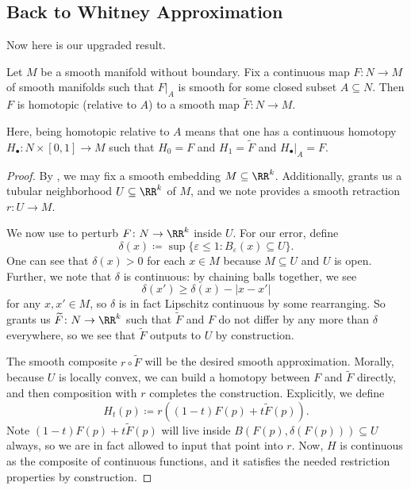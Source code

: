 \documentclass[../notes.tex]{subfiles}
\begin{document}
\subsection{Back to Whitney Approximation}
Now here is our upgraded result.
\begin{theorem}
	Let $M$ be a smooth manifold without boundary. Fix a continuous map $F\colon N\to M$ of smooth manifolds such that $F|_A$ is smooth for some closed subset $A\subseteq N$. Then $F$ is homotopic (relative to $A$) to a smooth map $\widetilde F\colon N\to M$.
\end{theorem}
Here, being homotopic relative to $A$ means that one has a continuous homotopy $H_\bullet\colon N\times[0,1]\to M$ such that $H_0=F$ and $H_1=\widetilde F$ and $H_\bullet|_A=F$.
\begin{proof}
	By , we may fix a smooth embedding $M\subseteq\RR^k$. Additionally,  grants us a tubular neighborhood $U\subseteq\RR^k$ of $M$, and we note  provides a smooth retraction $r\colon U\to M$.

	We now use  to perturb $F\colon N\to\RR^k$ inside $U$. For our error, define
	\[\delta(x)\coloneqq\sup\{\varepsilon\le1:B_\varepsilon(x)\subseteq U\}.\]
	One can see that $\delta(x)>0$ for each $x\in M$ because $M\subseteq U$ and $U$ is open. Further, we note that $\delta$ is continuous: by chaining balls together, we see
	\[\delta(x')\ge\delta(x)-\left|x-x'\right|\]
	for any $x,x'\in M$, so $\delta$ is in fact Lipschitz continuous by some rearranging. So  grants us $\widetilde F\colon N\to\RR^k$ such that $\widetilde F$ and $F$ do not differ by any more than $\delta$ everywhere, so we see that $\widetilde F$ outputs to $U$ by construction.

	The smooth composite $r\circ\widetilde F$ will be the desired smooth approximation. Morally, because $U$ is locally convex, we can build a homotopy between $F$ and $\widetilde F$ directly, and then composition with $r$ completes the construction. Explicitly, we define
	\[H_t(p)\coloneqq r\left((1-t)F(p)+t\widetilde F(p)\right).\]
	Note $(1-t)F(p)+t\widetilde F(p)$ will live inside $B(F(p),\delta(F(p)))\subseteq U$ always, so we are in fact allowed to input that point into $r$. Now, $H$ is continuous as the composite of continuous functions, and it satisfies the needed restriction properties by construction.
\end{proof}
\end{document}
